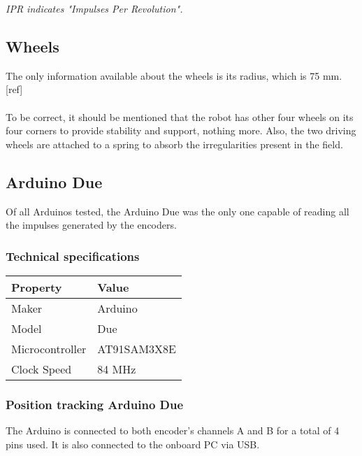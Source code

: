 \textit{IPR indicates "Impulses Per Revolution".}

\subsection{Wheels}
The only information available about the wheels is its radius, which is 75 mm. [ref]
\\ \\
To be correct, it should be mentioned that the robot has other four wheels on its four corners to provide stability and support, nothing more. Also, the two 
driving wheels are attached to a spring to absorb the irregularities present in the field.

\subsection{Arduino Due}
Of all Arduinos tested, the Arduino Due was the only one capable of reading all the impulses generated by the encoders.

\subsubsection{Technical specifications}
\begin{center}
    \begin{table}[h]
        \begin{tabularx}{\textwidth}{|X|X|}
            \hline
            \textbf{Property} &  \textbf{Value} \\
            \hline
            Maker & Arduino \\
            \hline
            Model & Due \\
            \hline
            Microcontroller & AT91SAM3X8E \\
            \hline
            Clock Speed & 84 MHz \\
            \hline
        \end{tabularx}
    \end{table}
\end{center}

\subsubsection{Position tracking Arduino Due}
The Arduino is connected to both encoder's channels A and B for a total of 4 pins used. It is also connected to the onboard PC via USB.
\\ \\

